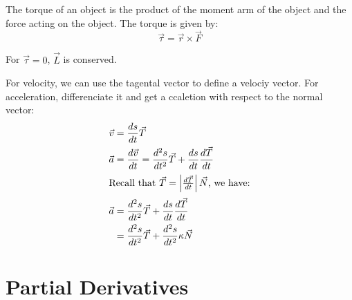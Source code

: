 \documentclass[11pt]{report}
\begin{document}
\begin{definition}[Torque]
    The torque of an object is the product of the moment arm of the object and the force acting on the object. The torque is given by:
    \begin{equation}
        \vec{\tau} = \vec{r} \times \vec{F}
    \end{equation}
\end{definition}
For $\vec{\tau} = 0$, $\vec{L}$ is conserved.
\begin{definition}[Acceleration]
    For velocity, we can use the tagental vector to define a velociy vector. For acceleration, differenciate it and get a ccaletion with respect to the normal vector:
    \begin{align}
        \vec{v} &= \frac{ds}{dt}\vec{T} \\
        \vec{a} &= \frac{d\vec{v}}{dt} = \frac{d^2s}{dt^2}\vec{T} + \frac{ds}{dt}\frac{d\vec{T}}{dt} \nonumber \\
        \intertext{Recall that $\vec{T} = \left | \frac{d\vec{T}}{dt} \right | \vec{N}$, we have:}
        \vec{a} &= \frac{d^2s}{dt^2}\vec{T} + \frac{ds}{dt}\frac{d\vec{T}}{dt} \nonumber \\
        &= \frac{d^2s}{dt^2}\vec{T} + \frac{d^2s}{dt^2}\kappa\vec{N}
    \end{align}
\end{definition}
\section{Partial Derivatives}
\end{document}

